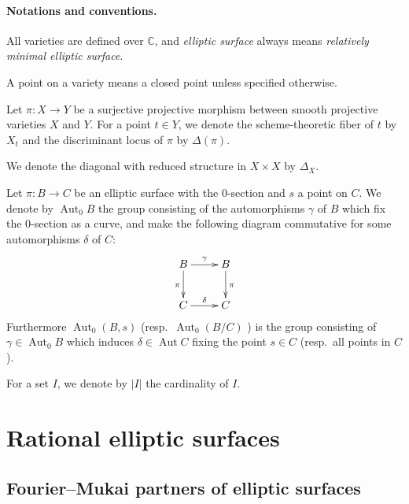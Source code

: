 \documentclass[a4paper,11pt]{article}
\theoremstyle{definition}\newtheorem{defn}[thm]{Definition}
\theoremstyle{remark}\newtheorem{remark}[thm]{Remark}
\numberwithin{equation}{section}
\newcommand{\Aut}{\ensuremath{\operatorname{Aut}}}
\newcommand{\C}{\mathbb C}
\begin{document}

\paragraph{Notations and conventions.}
All varieties are defined over $\C$,
and \emph{elliptic surface}
always means \emph{relatively minimal elliptic surface}.


A point on a variety means a closed point unless specified
 otherwise.
  
Let $\pi\colon X\to Y$  
be a surjective projective morphism
between smooth projective varieties $X$ and $Y$. For a point $t\in Y$, 
we denote the scheme-theoretic fiber of $t$ by $X_t$ and
the discriminant locus of $\pi$ by $\Delta(\pi)$.

We denote the diagonal with reduced structure 
in $X\times X$ by $\Delta _X$.
 

Let $\pi\colon B\to C$ be an elliptic 
surface with the $0$-section
and $s$ a point on $C$. 
We denote by $\Aut _0 B$  the group  
consisting of the automorphisms $\gamma$ of $B$ 
which fix the $0$-section as a curve,
and make the following diagram commutative for 
some automorphisms $\delta$ of $C$:
%
\[ \xymatrix{ B \ar[d]_{\pi} \ar[r] ^{\gamma} & B \ar[d]^{\pi} \\  C \ar[r]^{\delta} & C}\]
%
Furthermore $\Aut _0(B,s)$ (resp.~$\Aut _0(B/C)$ ) 
is the group consisting of $\gamma\in \Aut _0B$
which induces $\delta\in \Aut C$
 fixing the point $s\in C$
(resp.~all points in $C$).

    
 For a set $I$, we denote by $|I|$ the cardinality of $I$.

\section{Rational  elliptic surfaces}\label{section:elliptic surfaces}

\subsection{Fourier--Mukai partners of elliptic surfaces}
\label{sub:FMellipitic}
\end{document}
